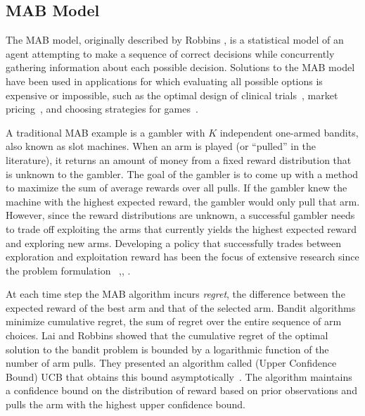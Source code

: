 \documentclass[10pt, conference]{ieeeconf}      %
\begin{document}
\subsection{MAB Model}
The MAB model, originally described by Robbins \cite{robbins1985some}, is a statistical model of an agent attempting to make a sequence of correct decisions while concurrently gathering information about each possible decision. Solutions to the MAB model have been used in applications for which evaluating all possible options is expensive or impossible, such as the optimal design of clinical trials~\cite{simon1989optimal}, market pricing~\cite{rothschild1974two}, and choosing strategies for games~\cite{st2012online}. 

A traditional MAB example is a gambler with $K$ independent one-armed bandits, also known as slot machines.
When an arm is played (or ``pulled'' in the literature), it returns an amount of money from a fixed reward distribution that is unknown to the gambler.
The goal of the gambler is to come up with a method to maximize the sum of average rewards over all pulls.
If the gambler knew the machine with the highest expected reward, the gambler would only pull that arm.
However, since the reward distributions are unknown, a successful gambler needs to trade off exploiting the arms that currently yields the highest expected reward and exploring new arms.
Developing a policy that successfully trades between exploration and exploitation reward has been the focus of extensive research since the problem formulation  ~\cite{bergemann2006bandit},\cite{bubeck2009pure}, \cite{robbins1985some}.

At each time step the MAB algorithm incurs \textit{regret}, the difference between the expected reward of the best arm and that of the selected arm. Bandit algorithms minimize cumulative regret, the sum of regret over the entire sequence of arm choices.
Lai and Robbins\cite{lai1985asymptotically} showed that the cumulative regret of the optimal solution to the bandit problem is bounded by a logarithmic function of the number of arm pulls.
They presented an algorithm called (Upper Confidence Bound) UCB that obtains this bound asymptotically~\cite{lai1985asymptotically}.
The algorithm maintains a confidence bound on the distribution of reward based on prior observations and pulls the arm with the highest upper confidence bound.
\end{document}
